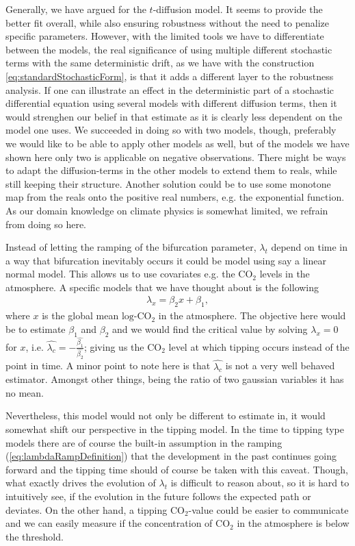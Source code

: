 Generally, we have argued for the $t$-diffusion model. It seems to provide the better fit overall, while also ensuring robustness without the need to penalize specific parameters. However, with the limited tools we have to differentiate between the models, the real significance of using multiple different stochastic terms with the same deterministic drift, as we have with the construction \ref{eq:standardStochasticForm}, is that it adds a different layer to the robustness analysis. If one can illustrate an effect in the deterministic part of a stochastic differential equation using several models with different diffusion terms, then it would strenghen our belief in that estimate as it is clearly less dependent on the model one uses. We succeeded in doing so with two models, though, preferably we would like to be able to apply other models as well, but of the models we have shown here only two is applicable on negative observations. There might be ways to adapt the diffusion-terms in the other models to extend them to reals, while still keeping their structure. Another solution could be to use some monotone map from the reals onto the positive real numbers, e.g. the exponential function. As our domain knowledge on climate physics is somewhat limited, we refrain from doing so here.

Instead of letting the ramping of the bifurcation parameter, $\lambda_t$ depend on time in a way that bifurcation inevitably occurs it could be model using say a linear normal model. This allows us to use covariates e.g. the $\mathrm{CO}_2$ levels in the atmosphere. A specific models that we have thought about is the following
\begin{align}
    \lambda_x= \beta_2 x + \beta_1, \label{eq:alternativeLambda}
\end{align}
where $x$ is the global mean $\mathrm{log}$-$\mathrm{CO}_2$ in the atmosphere. The objective here would be to estimate $\beta_1$ and $\beta_2$ and we would find the critical value by solving $\lambda_x = 0$ for $x$, i.e. $\hat{\lambda_c} = -\frac{\hat{\beta_1}}{\hat{\beta_2}}$; giving us the $\mathrm{CO}_2$ level at which tipping occurs instead of the point in time. A minor point to note here is that $\hat{\lambda_c}$ is not a very well behaved estimator. Amongst other things, being the ratio of two gaussian variables it has no mean.

Nevertheless, this model would not only be different to estimate in, it would somewhat shift our perspective in the tipping model. In the time to tipping type models there are of course the built-in assumption in the ramping (\ref{eq:lambdaRampDefinition}) that the development in the past continues going forward and the tipping time should of course be taken with this caveat. Though, what exactly drives the evolution of $\lambda_t$ is difficult to reason about, so it is hard to intuitively see, if the evolution in the future follows the expected path or deviates. 
On the other hand, a tipping $\mathrm{CO}_2$-value could be easier to communicate and we can easily measure if the concentration of $\mathrm{CO}_2$ in the atmosphere is below the threshold. 

